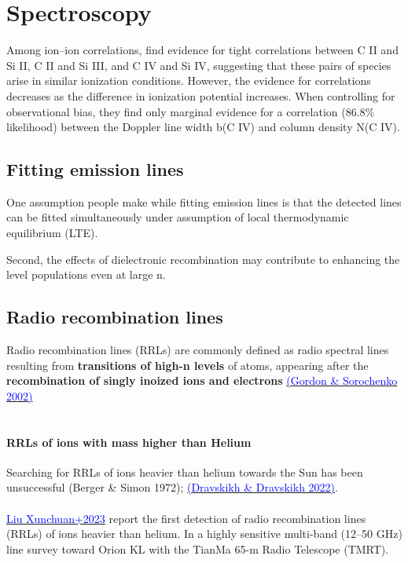 \chapter{Spectroscopy}

 Among ion–ion correlations, \cite{Burchett_2015} find evidence for tight correlations between C II and Si II, C II and Si III, and C IV and Si IV, suggesting that these pairs of species arise in similar ionization conditions. However, the evidence for correlations decreases as the difference in ionization potential increases. When controlling for observational bias, they find only marginal evidence for a correlation (86.8\% likelihood) between the Doppler line width b(C IV) and column density N(C IV).


\section{Fitting emission lines}

One assumption people make while fitting emission lines is that the detected lines can be fitted simultaneously under assumption of local thermodynamic equilibrium (LTE). 

 Second, the effects of dielectronic recombination may contribute to enhancing the level populations even at large n.

 \section{Radio recombination lines}

 

 Radio recombination lines (RRLs) are commonly defined as radio spectral lines resulting from \textbf{transitions of high-n levels} of atoms, appearing after the \textbf{recombination of singly inoized ions and electrons} \href{https://ui.adsabs.harvard.edu/abs/2002ASSL..282.....G/abstract}{\textcolor{blue}{(Gordon \& Sorochenko 2002)}}\\
 \\
 \subsubsection{RRLs of ions with mass higher than Helium}
Searching for RRLs of ions heavier than helium towards the Sun has been unsuccessful (Berger \& Simon 1972); \href{https://link.springer.com/article/10.1134/S1063772922060038}{\textcolor{blue}{(Dravskikh \& Dravskikh 2022)}}.\\
\\
 \href{https://arxiv.org/pdf/2302.03398.pdf}{\textcolor{blue}{Liu Xunchuan+2023}} report the first detection of radio recombination lines (RRLs) of ions heavier than helium. In a highly sensitive multi-band (12–50 GHz) line survey toward Orion KL with the TianMa 65-m Radio Telescope (TMRT). 